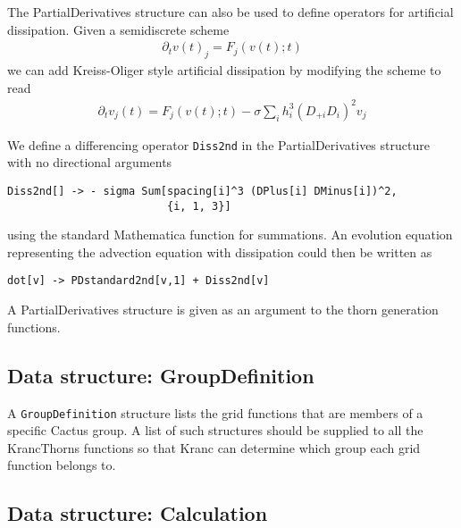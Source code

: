 \documentclass{report}
\begin{document}
The PartialDerivatives structure can also be used to define operators
for artificial dissipation.  Given a semidiscrete scheme
\begin{eqnarray}
\partial_t v(t)_j = F_j(v(t);t)
\end{eqnarray}
we can add Kreiss-Oliger style artificial dissipation by modifying the
scheme to read
\begin{eqnarray}
\partial_t v_j(t) = F_j(v(t);t) - \sigma \sum_i h_i^3 (D_{+i} D_{i})^2 v_j
\end{eqnarray}

We define a differencing operator {\tt Diss2nd} in the
PartialDerivatives structure with no directional arguments

\begin{center}
\begin{minipage}{0.8 \textwidth}
\begin{verbatim}
Diss2nd[] -> - sigma Sum[spacing[i]^3 (DPlus[i] DMinus[i])^2, 
                         {i, 1, 3}]
\end{verbatim}
\end{minipage}
\end{center}

using the standard Mathematica function for summations.  An evolution
equation representing the advection equation with dissipation could
then be written as

\begin{center}
\begin{minipage}{0.8 \textwidth}
\begin{verbatim}
dot[v] -> PDstandard2nd[v,1] + Diss2nd[v]
\end{verbatim}
\end{minipage}
\end{center}

A PartialDerivatives structure is given as an argument to the thorn
generation functions.

\subsection{Data structure: GroupDefinition}

A {\tt GroupDefinition} structure lists the grid functions that are
members of a specific Cactus group.  A list of such structures should
be supplied to all the KrancThorns functions so that Kranc can
determine which group each grid function belongs to.

\subsection{Data structure: Calculation}
\end{document}
